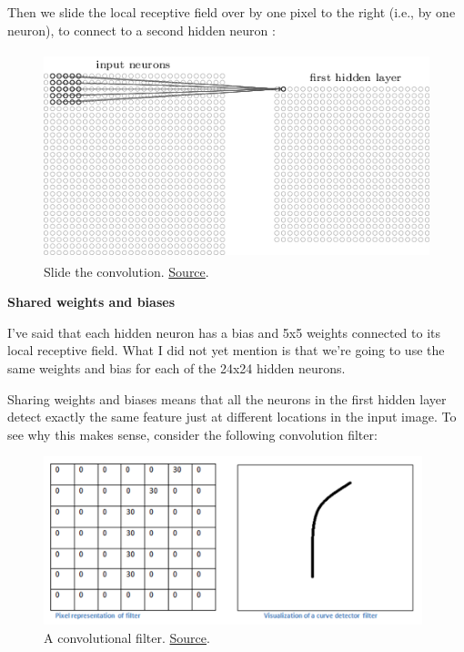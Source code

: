 \documentclass[a4paper]{tufte-handout}
\begin{document}
Then we slide the local receptive field over by one pixel
 to the right (i.e., by one
neuron), to connect to a second hidden neuron
:

\begin{figure}
  \includegraphics[height=60mm]{conv3}
  \caption{Slide the convolution.
\href{http://neuralnetworksanddeeplearning.com/chap6.html\%22}{Source}.
}
\end{figure}


\noindent \textbf{Shared weights and biases}

I've said that each hidden neuron has a bias and 5x5 weights connected
to its local receptive field. What I did not yet mention is that we're
going to use the same weights and bias for each of the 24x24 hidden
neurons.

Sharing weights and biases means that all the neurons in the first
hidden layer detect exactly the same feature just at different locations
in the input image. To see why this makes sense, consider the following
convolution filter:

\begin{figure}
\includegraphics[width=110mm]{conv_example1.png}
\caption{A convolutional filter.
\href{https://adeshpande3.github.io/adeshpande3.github.io/A-Beginner's-Guide-To-Understanding-Convolutional-Neural-Networks/}{Source}.
}
\end{figure}
\end{document}
